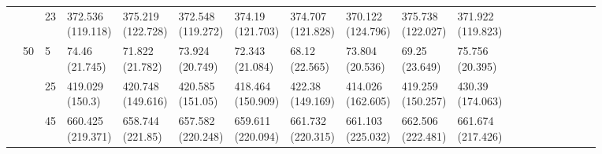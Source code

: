 \documentclass[12pt,a4paper]{article}
\begin{document}
\begin{landscape}
\begin{longtable}{lllllllllllrrrrrrrr}
 &  & 23 & \makecell{372.536 \\ (119.118)} & \makecell{375.219 \\ (122.728)} & \makecell{372.548 \\ (119.272)} & \makecell{374.19 \\ (121.703)} & \makecell{374.707 \\ (121.828)} & \makecell{370.122 \\ (124.796)} & \makecell{375.738 \\ (122.027)} & \makecell{371.922 \\ (119.823)} \\
\cline{2-11}
 & \multirow[t]{3}{*}{50} & 5 & \makecell{74.46 \\ (21.745)} & \makecell{71.822 \\ (21.782)} & \makecell{73.924 \\ (20.749)} & \makecell{72.343 \\ (21.084)} & \makecell{68.12 \\ (22.565)} & \makecell{73.804 \\ (20.536)} & \makecell{69.25 \\ (23.649)} & \makecell{75.756 \\ (20.395)} \\
 &  & 25 & \makecell{419.029 \\ (150.3)} & \makecell{420.748 \\ (149.616)} & \makecell{420.585 \\ (151.05)} & \makecell{418.464 \\ (150.909)} & \makecell{422.38 \\ (149.169)} & \makecell{414.026 \\ (162.605)} & \makecell{419.259 \\ (150.257)} & \makecell{430.39 \\ (174.063)} \\
 &  & 45 & \makecell{660.425 \\ (219.371)} & \makecell{658.744 \\ (221.85)} & \makecell{657.582 \\ (220.248)} & \makecell{659.611 \\ (220.094)} & \makecell{661.732 \\ (220.315)} & \makecell{661.103 \\ (225.032)} & \makecell{662.506 \\ (222.481)} & \makecell{661.674 \\ (217.426)} \\
\cline{1-11} \cline{2-11}

\end{longtable}
\end{landscape}
\end{document}
